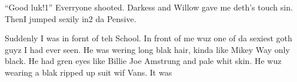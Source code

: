 \enquote{Good luk!1} Everryone shooted. Darkess and Willow gave me deth's touch sin. Then\dotfill I jumped sexily in2 da Pensive.

Suddenly I was in fornt of teh School. In front of me wuz one of da sexiest goth guyz I had ever seen. He was wering long blak hair, kinda like Mikey Way only black. He had gren eyes like Billie Joe Amstrung and pale whit skin. He wuz wearing a blak ripped up suit wif Vans. It was\dotfill {}
